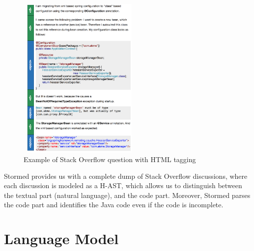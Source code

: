 \documentclass[12pt,mscthesis]{usiinfthesis}
\begin{document}
	\begin{figure}[htbp]
	 \centering
	\includegraphics[width=6cm,height=8cm]{stackOverflow}
	\caption{Example of Stack Overflow question with HTML tagging}
	\label{stackOverflow}
	\end{figure}


	Stormed provides us with a complete dump of Stack Overflow discussions, where each discussion is modeled as a H-AST, which allows us to distinguish between the textual part (natural language), and the code part. Moreover, Stormed parses the code part and identifies the Java code even if the code is incomplete.

	\section*{Language Model}
\end{document}
